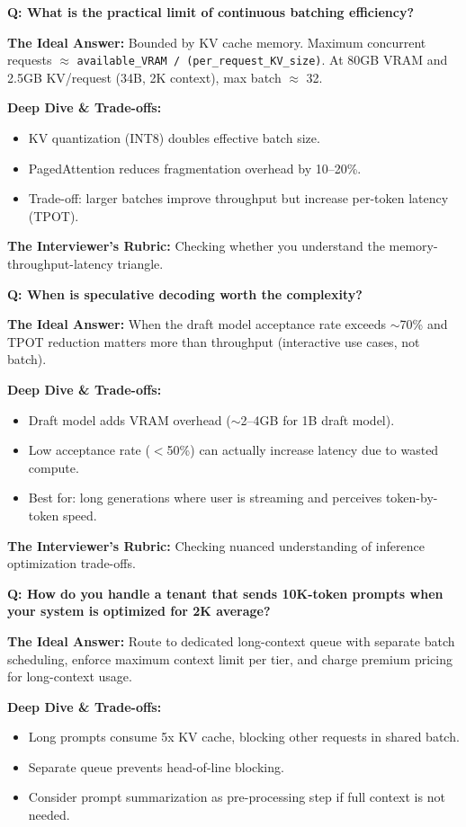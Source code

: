 \textbf{Q: What is the practical limit of continuous batching efficiency?}

\textbf{The Ideal Answer:} Bounded by KV cache memory. Maximum concurrent requests $\approx$ \texttt{available\_VRAM / (per\_request\_KV\_size)}. At 80GB VRAM and 2.5GB KV/request (34B, 2K context), max batch $\approx$ 32.

\textbf{Deep Dive \& Trade-offs:}
\begin{itemize}
  \item KV quantization (INT8) doubles effective batch size.
  \item PagedAttention reduces fragmentation overhead by 10--20\%.
  \item Trade-off: larger batches improve throughput but increase per-token latency (TPOT).
\end{itemize}

\textbf{The Interviewer's Rubric:} Checking whether you understand the memory-throughput-latency triangle.

\textbf{Q: When is speculative decoding worth the complexity?}

\textbf{The Ideal Answer:} When the draft model acceptance rate exceeds $\sim$70\% and TPOT reduction matters more than throughput (interactive use cases, not batch).

\textbf{Deep Dive \& Trade-offs:}
\begin{itemize}
  \item Draft model adds VRAM overhead ($\sim$2--4GB for 1B draft model).
  \item Low acceptance rate ($<$50\%) can actually increase latency due to wasted compute.
  \item Best for: long generations where user is streaming and perceives token-by-token speed.
\end{itemize}

\textbf{The Interviewer's Rubric:} Checking nuanced understanding of inference optimization trade-offs.

\textbf{Q: How do you handle a tenant that sends 10K-token prompts when your system is optimized for 2K average?}

\textbf{The Ideal Answer:} Route to dedicated long-context queue with separate batch scheduling, enforce maximum context limit per tier, and charge premium pricing for long-context usage.

\textbf{Deep Dive \& Trade-offs:}
\begin{itemize}
  \item Long prompts consume 5x KV cache, blocking other requests in shared batch.
  \item Separate queue prevents head-of-line blocking.
  \item Consider prompt summarization as pre-processing step if full context is not needed.
\end{itemize}

